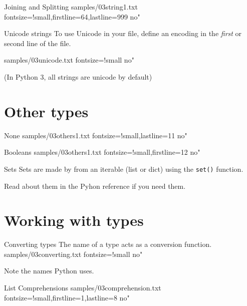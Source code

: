 \documentclass[reference]{pyslides}
\begin{document}
\begin{frame}[fragile]{Joining and Splitting}
 samples/03string1.txt fontsize=!small,firstline=64,lastline=999 no"
\end{frame}

\begin{frame}[fragile]{Unicode strings}
To use Unicode in your file, define an encoding in the \emph{first} or second line of the file.

\bigskip

 samples/03unicode.txt fontsize=!small no"

\bigskip

{\small (In Python 3, all strings are unicode by default)}
\end{frame}

\section{Other types}

\begin{frame}[fragile]{None}
 samples/03others1.txt fontsize=!small,lastline=11 no"
\end{frame}

\begin{frame}[fragile]{Booleans}
 samples/03others1.txt fontsize=!small,firstline=12 no"
\end{frame}

\begin{frame}[fragile]{Sets}
Sets are made by from an iterable (list or dict) using the \verb+set()+ function.

Read about them in the Pyhon reference if you need them.
\end{frame}

\section{Working with types}

\begin{frame}[fragile]{Converting types}
The name of a type acts as a conversion function.
 samples/03converting.txt fontsize=!small no"

\bigskip

Note the names Python uses.
\end{frame}

\begin{frame}[fragile]{List Comprehensions}
 samples/03comprehension.txt fontsize=!small,firstline=1,lastline=8 no"
\end{frame}
\end{document}
